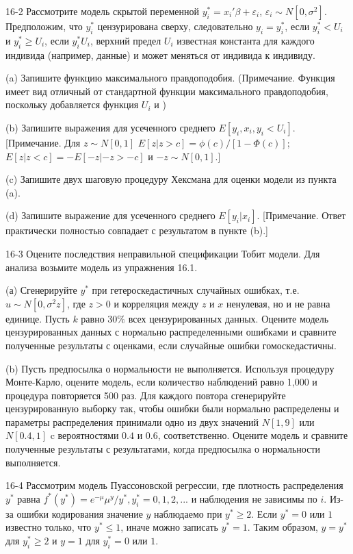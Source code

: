 16-2 Рассмотрите модель скрытой переменной $y_i^{*}=x_i'\beta+\varepsilon_i$, $\varepsilon_i{\sim}N[0,\sigma^2]$. Предположим, что $y_i^{*}$ цензурирована сверху, следовательно $y_i=y_i^{*}$, если $y_i^{*}<U_i$ и $y_i^{*}{\geq}U_i$, если $y_i^{*}U_i$, верхний предел $U_i$ известная константа для каждого индивида (например, данные) и может меняться от индивида к индивиду.

(a) Запишите функцию максимального правдоподобия. (Примечание. Функция имеет вид отличный от стандартной функции максимального правдоподобия, поскольку добавляется функция $U_i$ и  )

(b) Запишите выражения для усеченного среднего $E[y_i, x_i,y_i<U_i]$. [Примечание. Для $z{\sim}N[0,1]$ $E[z|z>c]=\phi(c)/[1-\Phi(c)]$; $E[z|z<c]=-E[-z|-z>-c]$ и $-z{\sim}N[0,1].$]

(c) Запишите двух шаговую процедуру Хексмана для оценки модели из пункта (a).

(d) Запишите выражение для усеченного среднего $E[y_i|x_i]$. [Примечание. Ответ практически полностью совпадает с результатом в пункте (b).]

16-3 Оцените последствия неправильной спецификации Тобит модели. Для анализа возьмите модель из упражнения 16.1.

(а) Сгенерируйте $y^{*}$ при гетероскедастичных случайных ошибках, т.е. $u{\sim}N[0,\sigma^2z]$, где $z>0$ и корреляция между $z$ и $x$ ненулевая, но и не равна единице. Пусть $k$ равно $30\%$ всех цензурированных данных. Оцените модель цензурированных данных с нормально распределенными ошибками и сравните полученные результаты с оценками, если случайные ошибки гомоскедастичны.

(b) Пусть предпосылка о нормальности не выполняется. Используя процедуру Монте-Карло, оцените модель, если количество наблюдений равно 1,000 и процедура повторяется 500 раз. Для каждого повтора сгенерируйте цензурированную выборку так, чтобы ошибки были нормально распределены и параметры распределения принимали одно из двух значений $N[1,9]$ или $N[0.4,1]$ c вероятностями $0.4$ и $0.6$, соответственно. Оцените модель  и сравните полученные результаты с результатами, когда предпосылка о нормальности выполняется.

16-4 Рассмотрим модель Пуассоновской регрессии, где плотность распределения $y^{*}$ равна $f^{*}(y^{*})=e^{-\mu}\mu^{y}/y^{*}, y_i^{*}=0,1,2,...$ и наблюдения не зависимы по $i$. Из-за ошибки кодирования значение $y$ наблюдаемо при $y^{*}{\geq}2$. Если $y^{*}=0$ или $1$ известно только, что $y^{*}{\leq}1$, иначе можно записать $y^{*}=1$. Таким образом, $y=y^{*}$ для $y_i^{*}{\geq}2$ и $y=1$ для $y_i^{*}=0$ или $1$.

